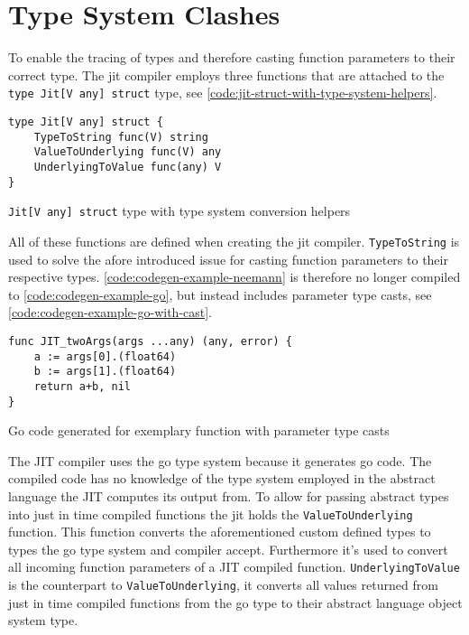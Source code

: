 \section{Type System Clashes}

To enable the tracing of types and therefore casting function parameters to
their correct type. The jit compiler employs three functions that are attached
to the \texttt{type Jit[V any] struct} type, see
\autoref{code:jit-struct-with-type-system-helpers}.

\begin{listing}[H]
    \begin{verbatim}
type Jit[V any] struct {
	TypeToString func(V) string
	ValueToUnderlying func(V) any
	UnderlyingToValue func(any) V
}
    \end{verbatim}
    \caption{\texttt{Jit[V any] struct} type with type system conversion helpers}
    \label{code:jit-struct-with-type-system-helpers}
\end{listing}

All of these functions are defined when creating the jit compiler.
\texttt{TypeToString} is used to solve the afore introduced issue for casting
function parameters to their respective types.
\autoref{code:codegen-example-neemann} is therefore no longer compiled to
\autoref{code:codegen-example-go}, but instead includes parameter type casts,
see \autoref{code:codegen-example-go-with-cast}.

\begin{listing}[H]
    \begin{verbatim}
func JIT_twoArgs(args ...any) (any, error) { 
    a := args[0].(float64)
    b := args[1].(float64)
    return a+b, nil
}
    \end{verbatim}
    \caption{Go code generated for exemplary function with parameter type casts}
    \label{code:codegen-example-go-with-cast}
\end{listing}

The JIT compiler uses the go type system because it generates go code. The
compiled code has no knowledge of the type system employed in the abstract
language the JIT computes its output from. To allow for passing abstract types
into just in time compiled functions the jit holds the
\texttt{ValueToUnderlying} function. This function converts the aforementioned
custom defined types to types the go type system and compiler accept.
Furthermore it's used to convert all incoming function parameters of a JIT
compiled function. \texttt{UnderlyingToValue} is the counterpart to
\texttt{ValueToUnderlying}, it converts all values returned from just in time
compiled functions from the go type to their abstract language object system
type. 

